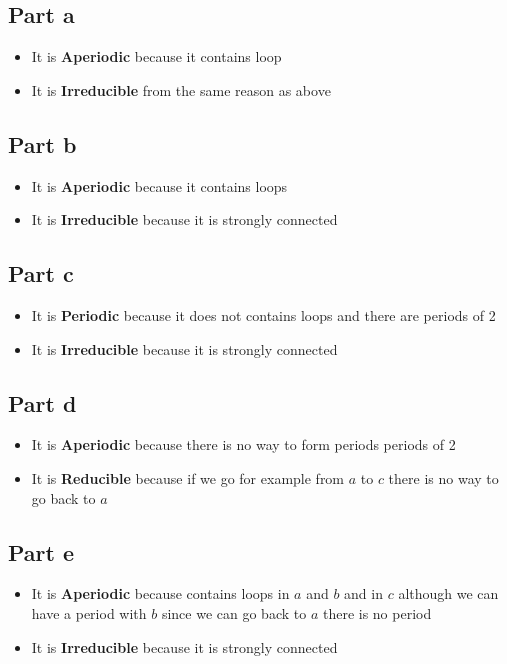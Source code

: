 \documentclass[12pt, a4paper]{article}
\begin{document}
\subsection{Part a}
\begin{itemize}
 \item It is \textbf{Aperiodic} because it contains loop
 \item It is \textbf{Irreducible} from the same reason as above 
\end{itemize}  

\subsection{Part b}
\begin{itemize}
\item It is \textbf{Aperiodic} because it contains loops
\item It is \textbf{Irreducible} because it is strongly connected
\end{itemize}  

\subsection{Part c}
\begin{itemize}
\item It is \textbf{Periodic} because it does not contains loops and there are
  periods of 2
\item It is \textbf{Irreducible} because it is strongly connected
\end{itemize}  

\subsection{Part d}
\begin{itemize}
\item It is \textbf{Aperiodic} because there is no way to form periods
  periods of 2
\item It is \textbf{Reducible} because if we go for example from $a$ to $c$
  there is no way to go back to $a$
\end{itemize}  

\subsection{Part e}
\begin{itemize}
\item It is \textbf{Aperiodic} because contains loops in $a$ and $b$ and in $c$
  although we can have a period with $b$ since we can go back to $a$ there is no
  period
\item It is \textbf{Irreducible} because it is strongly connected
\end{itemize}  
\end{document}

